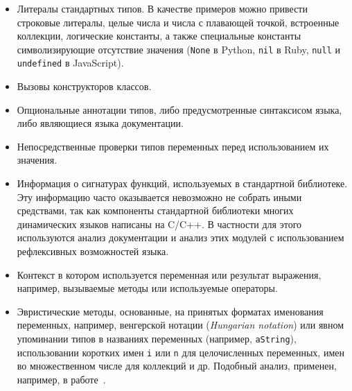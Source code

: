 \begin{itemize}
    \item{Литералы стандартных типов. В качестве примеров можно привести
        строковые литералы, целые числа и числа с плавающей точкой, встроенные
        коллекции, логические константы, а также специальные константы символизирующие
        отсутствие значения (\texttt{None} в Python, \texttt{nil} в Ruby,
        \texttt{null} и \texttt{undefined} в JavaScript).}
    \item{Вызовы конструкторов классов.}
    \item{Опциональные аннотации типов, либо предусмотренные синтаксисом языка, либо
        являющиеся языка документации.}
    \item{Непосредственные проверки типов переменных перед использованием их
        значения.}
    \item{Информация о сигнатурах функций, используемых в стандартной
        библиотеке. Эту информацию часто оказывается невозможно не собрать иными
        средствами, так как компоненты стандартной библиотеки многих
        динамических языков написаны на C/C++. В частности для этого
        используются анализ документации и анализ этих модулей с использованием
        рефлексивных возможностей языка.}
    \item{Контекст в котором используется переменная или результат выражения, 
        например, вызываемые методы или используемые операторы.}
    \item{Эвристические методы, основанные, на принятых форматах
        именования переменных, например, венгерской нотации (\emph{Hungarian
          notation}) или явном упоминании типов в названиях переменных (например,
        \texttt{aString}), использовании коротких имен \texttt{i} или \texttt{n}
        для целочисленных переменных, имен во множественном числе для коллекций
        и др. Подобный анализ, применен, например, в работе~\cite[]{Tu}.
    }
\end{itemize}
     


